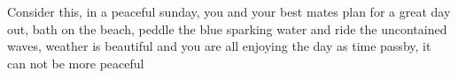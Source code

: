 Consider this, in a peaceful sunday, you and your best mates plan for a great day out, bath on the beach, peddle the blue sparking water and ride the uncontained waves, weather is beautiful and you are all enjoying the day as time passby, it can not be more peaceful 